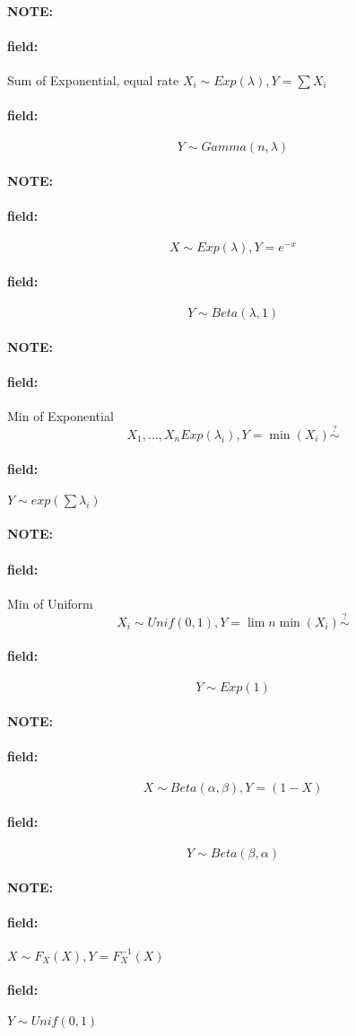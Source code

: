 \documentclass[12pt]{article}
\newenvironment{note}{\paragraph{NOTE:}}{}
\newenvironment{field}{\paragraph{field:}}{}
\begin{document}
\begin{note}
  \begin{field}
    Sum of Exponential, equal rate
    $X_i \sim Exp(\lambda), Y = \sum X_i$
  \end{field}
  \begin{field}
    $$Y \sim Gamma(n,\lambda)$$
  \end{field}
\end{note}

\begin{note}
  \begin{field}
    $$ X \sim Exp(\lambda), Y  = e^{-x}$$
  \end{field}
  \begin{field}
    $$Y \sim Beta(\lambda,1)$$
  \end{field}
\end{note}

\begin{note}
  \begin{field}
    Min of Exponential
    $$X_1, \ldots , X_n Exp(\lambda_i), Y = \min(X_i) \overset{?}{\sim}$$
  \end{field}
  \begin{field}
    $Y \sim exp(\sum \lambda_i)$
  \end{field}
\end{note}

\begin{note}
  \begin{field}
    Min of Uniform
    $$ X_i \sim Unif(0,1), Y = \lim n \min(X_i) \overset{?}{\sim}$$
  \end{field}
  \begin{field}
    $$Y \sim Exp(1)$$
  \end{field}
\end{note}

\begin{note}
  \begin{field}
    $$ X \sim Beta(\alpha,\beta), Y = (1-X)$$
  \end{field}
  \begin{field}
    $$ Y \sim Beta(\beta,\alpha)$$
  \end{field}
\end{note}

\begin{note}
  \begin{field}
    $X \sim F_X(X), Y = F^{-1}_X(X)$
  \end{field}
  \begin{field}
    $Y \sim Unif(0,1)$
  \end{field}
\end{note}
\end{document}
